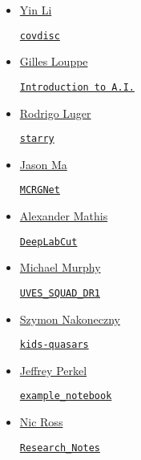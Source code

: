 \documentclass[11pt,a4paper]{article}
\begin{document}
\begin{itemize}
\item \href{https://github.com/eelregit/}{Yin Li} 
  \begin{itemize}
    \href{https://github.com/eelregit/covdisc}{\tt covdisc}
  \end{itemize}

\item \href{https://github.com/glouppe}{Gilles Louppe}
  \begin{itemize}
    \href{https://github.com/glouppe/info8006-introduction-to-ai}{\tt  Introduction to A.I.}
  \end{itemize}

\item \href{https://github.com/rodluger}{Rodrigo Luger}
  \begin{itemize}
    \href{https://github.com/rodluger/starry}{{\tt starry}}
  \end{itemize}

\item \href{https://github.com/myinxd}{Jason Ma}
  \begin{itemize}
    \href{https://github.com/myinxd/mcrgnet}{\tt MCRGNet}
  \end{itemize}

\item \href{https://github.com/AlexEMG}{Alexander Mathis}
  \begin{itemize}
    \href{https://github.com/AlexEMG/DeepLabCut}{\tt DeepLabCut} 
  \end{itemize}

\item \href{https://github.com/MTMurphy77/}{Michael Murphy}
  \begin{itemize}
    \href{https://github.com/MTMurphy77/UVES_SQUAD_DR1}{\tt UVES\_SQUAD\_DR1}
  \end{itemize}

  \item \href{https://github.com/snakoneczny}{Szymon Nakoneczny}
  \begin{itemize}
    \href{https://github.com/snakoneczny/kids-quasars}{\tt kids-quasars}
  \end{itemize}

\item \href{https://github.com/jperkel/}{Jeffrey Perkel}
  \begin{itemize}
    \href{https://github.com/jperkel/example_notebook}{\tt example\_notebook}
  \end{itemize}

\item \href{https://github.com/d80b2t}{Nic Ross}
  \begin{itemize}
    \href{https://github.com/d80b2t/Research\_Notes}{\tt Research\_Notes}
  \end{itemize}


\end{itemize}
\end{document}
